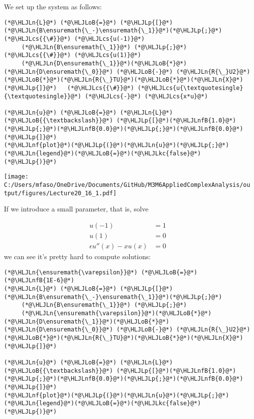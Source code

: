 \documentclass[12pt,a4paper]{article}
\newcommand{\HLJLkc}[1]{\textcolor[RGB]{59,151,46}{\textit{#1}}}
\newcommand{\HLJLn}[1]{#1}
\newcommand{\HLJLnf}[1]{\textcolor[RGB]{66,102,213}{#1}}
\newcommand{\HLJLnfB}[1]{\textcolor[RGB]{59,151,46}{#1}}
\newcommand{\HLJLoB}[1]{\textcolor[RGB]{102,102,102}{\textbf{#1}}}
\newcommand{\HLJLp}[1]{#1}
\newcommand{\HLJLcs}[1]{\textcolor[RGB]{153,153,119}{\textit{#1}}}
\begin{document}
We set up the system as follows:


\begin{lstlisting}
(*@\HLJLn{L}@*) (*@\HLJLoB{=}@*) (*@\HLJLp{[}@*)(*@\HLJLn{B\ensuremath{\_-}\ensuremath{\_1}}@*)(*@\HLJLp{;}@*)   (*@\HLJLcs{{\#}}@*) (*@\HLJLcs{u(-1)}@*)
     (*@\HLJLn{B\ensuremath{\_1}}@*) (*@\HLJLp{;}@*)   (*@\HLJLcs{{\#}}@*) (*@\HLJLcs{u(1)}@*)
     (*@\HLJLn{D\ensuremath{\_1}}@*)(*@\HLJLoB{*}@*)(*@\HLJLn{D\ensuremath{\_0}}@*) (*@\HLJLoB{-}@*) (*@\HLJLn{R{\_}U2}@*)(*@\HLJLoB{*}@*)(*@\HLJLn{R{\_}TU}@*)(*@\HLJLoB{*}@*)(*@\HLJLn{X}@*)(*@\HLJLp{]}@*)   (*@\HLJLcs{{\#}}@*) (*@\HLJLcs{u{\textquotesingle}{\textquotesingle}}@*) (*@\HLJLcs{-}@*) (*@\HLJLcs{x*u}@*)

(*@\HLJLn{u}@*) (*@\HLJLoB{=}@*) (*@\HLJLn{L}@*) (*@\HLJLoB{{\textbackslash}}@*) (*@\HLJLp{[}@*)(*@\HLJLnfB{1.0}@*)(*@\HLJLp{;}@*)(*@\HLJLnfB{0.0}@*)(*@\HLJLp{;}@*)(*@\HLJLnfB{0.0}@*)(*@\HLJLp{]}@*)
(*@\HLJLnf{plot}@*)(*@\HLJLp{(}@*)(*@\HLJLn{u}@*)(*@\HLJLp{;}@*) (*@\HLJLn{legend}@*)(*@\HLJLoB{=}@*)(*@\HLJLkc{false}@*)(*@\HLJLp{)}@*)
\end{lstlisting}

\texttt{[image: C:/Users/mfaso/OneDrive/Documents/GitHub/M3M6AppliedComplexAnalysis/output/figures/Lecture20\_16\_1.pdf]}

If we introduce a small parameter, that is, solve


\begin{align*}
u(-1) &= 1\\
u(1) &= 0\\
\epsilon u''(x) - xu(x) &= 0
\end{align*}
we can see it's pretty hard to compute solutions:


\begin{lstlisting}
(*@\HLJLn{\ensuremath{\varepsilon}}@*) (*@\HLJLoB{=}@*) (*@\HLJLnfB{1E-6}@*)
(*@\HLJLn{L}@*) (*@\HLJLoB{=}@*) (*@\HLJLp{[}@*)(*@\HLJLn{B\ensuremath{\_-}\ensuremath{\_1}}@*)(*@\HLJLp{;}@*)
     (*@\HLJLn{B\ensuremath{\_1}}@*) (*@\HLJLp{;}@*)
     (*@\HLJLn{\ensuremath{\varepsilon}}@*)(*@\HLJLoB{*}@*)(*@\HLJLn{D\ensuremath{\_1}}@*)(*@\HLJLoB{*}@*)(*@\HLJLn{D\ensuremath{\_0}}@*) (*@\HLJLoB{-}@*) (*@\HLJLn{R{\_}U2}@*)(*@\HLJLoB{*}@*)(*@\HLJLn{R{\_}TU}@*)(*@\HLJLoB{*}@*)(*@\HLJLn{X}@*)(*@\HLJLp{]}@*)

(*@\HLJLn{u}@*) (*@\HLJLoB{=}@*) (*@\HLJLn{L}@*) (*@\HLJLoB{{\textbackslash}}@*) (*@\HLJLp{[}@*)(*@\HLJLnfB{1.0}@*)(*@\HLJLp{;}@*)(*@\HLJLnfB{0.0}@*)(*@\HLJLp{;}@*)(*@\HLJLnfB{0.0}@*)(*@\HLJLp{]}@*)
(*@\HLJLnf{plot}@*)(*@\HLJLp{(}@*)(*@\HLJLn{u}@*)(*@\HLJLp{;}@*) (*@\HLJLn{legend}@*)(*@\HLJLoB{=}@*)(*@\HLJLkc{false}@*)(*@\HLJLp{)}@*)
\end{lstlisting}
\end{document}
